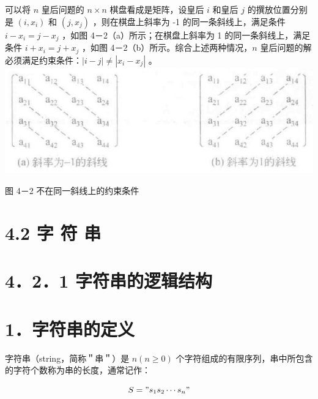 \documentclass[10pt]{article}
\begin{document}
可以将 $n$ 皇后问题的 $n \times n$ 棋盘看成是矩阵，设皇后 $i$ 和皇后 $j$ 的撰放位置分别是 $\left(i, x_{i}\right)$ 和 $\left(j, x_{j}\right)$ ，则在棋盘上斜率为 -1 的同一条斜线上，满足条件 $i-x_{i}=j-x_{j}$ ，如图 4－2（a）所示；在棋盘上斜率为 1 的同一条斜线上，满足条件 $i+x_{i}=j+x_{j}$ ，如图 4－2（b）所示。综合上述两种情况，$n$ 皇后问题的解必须满足约束条件：$|i-j| \neq\left|x_{i}-x_{j}\right|$ 。\\
\includegraphics[max width=\textwidth, center]{2025_06_06_704745ea57b15b2333e5g-113(2)}

图 4－2 不在同一斜线上的约束条件

\section*{4.2 字 符 串}
\section*{4．2．1 字符串的逻辑结构}
\section*{1．字符串的定义}
字符串（string，简称＂串＂）是 $n(n \geqslant 0)$ 个字符组成的有限序列，串中所包含的字符个数称为串的长度，通常记作：

$$
S=" s_{1} s_{2} \cdots s_{n} "
$$
\end{document}
